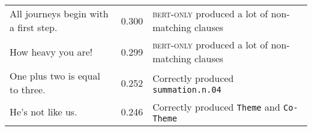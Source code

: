 \documentclass[11pt,a4paper]{article}
\newcommand{\bertonly}{\textsc{bert-only}}
\begin{document}
\begin{table*}[!t]
{\begin{tabular}{lrl}
All journeys begin with a first step.  &   0.300  & \bertonly{} produced a lot of non-matching clauses   \\
How heavy you are!   &  0.299  & \bertonly{} produced a lot of non-matching clauses   \\
One plus two is equal to three.   &  0.252  & Correctly produced \texttt{summation.n.04}  \\
He's not like us.  &   0.246  & Correctly produced \texttt{Theme} and \texttt{Co-Theme}   \\
\bottomrule
\end{tabular}
}
\caption{Sentences of the English 3.0.0 dev set for which our best model (+char +sem) produced the \textbf{best} DRSs, relative to the \bertonly{} baseline.\label{tab:bestsents}}
\end{table*}
\end{document}
